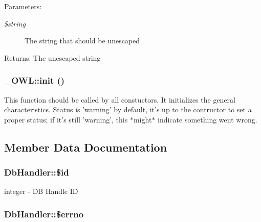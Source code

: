 \begin{Desc}
\item[Parameters:]
\begin{description}
\item[{\em \$string}]The string that should be unescaped \end{description}
\end{Desc}
\begin{Desc}
\item[Returns:]The unescaped string \end{Desc}
\hypertarget{class__OWL_e0ef3ded56e8a6b34b6461e5a721cd3e}{
\subsubsection{\setlength{\rightskip}{0pt plus 5cm}\_\-OWL::init ()}}
\label{class__OWL_e0ef3ded56e8a6b34b6461e5a721cd3e}


This function should be called by all constuctors. It initializes the general characteristics. Status is 'warning' by default, it's up to the contructor to set a proper status; if it's still 'warning', this $\ast$might$\ast$ indicate something went wrong. 

\subsection{Member Data Documentation}
\hypertarget{classDbHandler_d38e1c3312815c8ad4093957881092ff}{
\subsubsection{\setlength{\rightskip}{0pt plus 5cm}DbHandler::\$id}}
\label{classDbHandler_d38e1c3312815c8ad4093957881092ff}


integer - DB Handle ID \hypertarget{classDbHandler_f6e9f493be56617cb533763bb2a0e85a}{
\subsubsection{\setlength{\rightskip}{0pt plus 5cm}DbHandler::\$errno}}
\label{classDbHandler_f6e9f493be56617cb533763bb2a0e85a}


